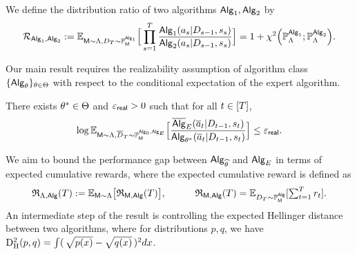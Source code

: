 \begin{definition}\label{def:dist_ratio}
\label{def:distribution-ratio}
We define the distribution ratio of two algorithms ${\mathsf{Alg}}_1,{\mathsf{Alg}}_2$ by
\begin{align*}{\mathcal{R}}_{{\mathsf{Alg}}_1,{\mathsf{Alg}}_2}
:=
\mathbb{E}_{{\mathsf{M}}\sim{\Lambda},{D}_{T}\sim\mathbb{P}_{\mathsf{M}}^{{\mathsf{Alg}}_1}}
\Big[\prod_{s=1}^{{T}}\frac{{\mathsf{Alg}}_1({a}_s|{D}_{s-1},{s}_s)}{{\mathsf{Alg}}_2({a}_s|{D}_{s-1},{s}_s)}\Big] = 1 + \chi^2\Big( \mathbb{P}_{\Lambda}^{{\mathsf{Alg}}_1};\mathbb{P}_{\Lambda}^{{\mathsf{Alg}}_2} \Big).
\end{align*}
\end{definition}


Our main result requires the realizability assumption of algorithm class $\{ {\mathsf{Alg}}_{\theta}\}_{{\theta} \in {\Theta}}$ with respect to the conditional expectation of the expert algorithm.

\begin{assumption}
\label{asp:realizability}
There exists ${\theta^*}\in{\Theta}$ and ${\varepsilon}_{\sf real} > 0$ such that for all $t\in[{T}]$,
\begin{align}
\label{eqn:plc_approx_general}
\log\mathbb{E}_{{\mathsf{M}} \sim {\Lambda}, {\overline{D}}_{T} \sim \mathbb{P}_{{\mathsf{M}}}^{{\mathsf{Alg}}_0,{\mathsf{Alg}}_{E}}}\Big[\frac{\overline{\mathsf{Alg}}_{{E}}({\overline{a}}_t|{D}_{t-1},{s}_t )}{{\mathsf{Alg}}_{\theta^*}({\overline{a}}_t|{D}_{t-1},{s}_t )}\Big] \le {\varepsilon}_{\sf real}.
\end{align}
\end{assumption}


We aim to bound the performance gap between ${\mathsf{Alg}}_{{\widehat{\theta}}}$ and ${\mathsf{Alg}}_{E}$ in terms of expected cumulative rewards, where the expected cumulative reward is defined as
\begin{align*}
\textstyle {\mathfrak{R}}_{{\Lambda},{\mathsf{Alg}}}({T})
:= \mathbb{E}_{{\mathsf{M}}\sim{\Lambda}}\big[{\mathfrak{R}}_{{\mathsf{M}},{\mathsf{Alg}}}({T}) \big],~~~~~~~~~ {\mathfrak{R}}_{{\mathsf{M}},{\mathsf{Alg}}}({T}) = \mathbb{E}_{{D}_{{T}} \sim\mathbb{P}^{{\mathsf{Alg}}}_{\mathsf{M}}}[\sum_{t=1}^{T} {r}_t].
\end{align*}
An intermediate step of the result is controlling the expected Hellinger distance between two algorithms, where for distributions $p, q$, we have ${\mathrm{D}^2_{\mathrm{H}}}(p, q) = \int (\,\sqrt{p(x)} - \sqrt{q(x)} \,)^2 d x$.

